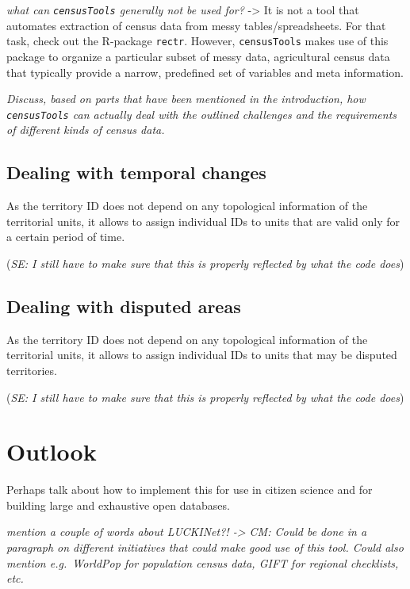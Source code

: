 \documentclass[12pt,]{article}
\begin{document}
\emph{what can \texttt{censusTools} generally not be used for?} -\textgreater{} It is not a tool that automates extraction of census data from messy tables/spreadsheets.
For that task, check out the R-package \texttt{rectr}.
However, \texttt{censusTools} makes use of this package to organize a particular subset of messy data, agricultural census data that typically provide a narrow, predefined set of variables and meta information.

\emph{Discuss, based on parts that have been mentioned in the introduction, how \texttt{censusTools} can actually deal with the outlined challenges and the requirements of different kinds of census data.}

\hypertarget{dealing-with-temporal-changes}{%
\subsection{Dealing with temporal changes}\label{dealing-with-temporal-changes}}

As the territory ID does not depend on any topological information of the territorial units, it allows to assign individual IDs to units that are valid only for a certain period of time.

(\emph{SE: I still have to make sure that this is properly reflected by what the code does})

\hypertarget{dealing-with-disputed-areas}{%
\subsection{Dealing with disputed areas}\label{dealing-with-disputed-areas}}

As the territory ID does not depend on any topological information of the territorial units, it allows to assign individual IDs to units that may be disputed territories.

(\emph{SE: I still have to make sure that this is properly reflected by what the code does})

\hypertarget{outlook}{%
\section{Outlook}\label{outlook}}

Perhaps talk about how to implement this for use in citizen science and for building large and exhaustive open databases.

\emph{mention a couple of words about LUCKINet?! -\textgreater{} CM: Could be done in a paragraph on different initiatives that could make good use of this tool. Could also mention e.g.~WorldPop for population census data, GIFT for regional checklists, etc.}
\end{document}
